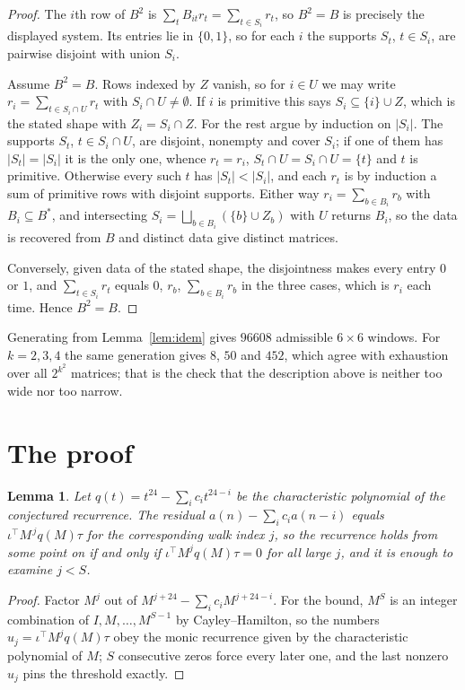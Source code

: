 \documentclass[11pt,a4paper]{article}
\theoremstyle{plain}
\newtheorem{lemma}[theorem]{Lemma}
\theoremstyle{definition}
\begin{document}
\begin{proof}
The $i$th row of $B^2$ is $\sum_t B_{it}r_t=\sum_{t\in S_i}r_t$, so $B^2=B$ is precisely the
displayed system. Its entries lie in $\{0,1\}$, so for each $i$ the supports $S_t$,
$t\in S_i$, are pairwise disjoint with union $S_i$.

Assume $B^2=B$. Rows indexed by $Z$ vanish, so for $i\in U$ we may write
$r_i=\sum_{t\in S_i\cap U}r_t$ with $S_i\cap U\neq\emptyset$. If $i$ is primitive this says
$S_i\subseteq\{i\}\cup Z$, which is the stated shape with $Z_i=S_i\cap Z$. For the rest argue
by induction on $|S_i|$. The supports $S_t$, $t\in S_i\cap U$, are disjoint, nonempty and
cover $S_i$; if one of them has $|S_t|=|S_i|$ it is the only one, whence $r_t=r_i$,
$S_t\cap U=S_i\cap U=\{t\}$ and $t$ is primitive. Otherwise every such $t$ has
$|S_t|<|S_i|$, and each $r_t$ is by induction a sum of primitive rows with disjoint supports.
Either way $r_i=\sum_{b\in B_i}r_b$ with $B_i\subseteq B^{\ast}$, and intersecting
$S_i=\bigsqcup_{b\in B_i}(\{b\}\cup Z_b)$ with $U$ returns $B_i$, so the data is recovered
from $B$ and distinct data give distinct matrices.

Conversely, given data of the stated shape, the disjointness makes every entry $0$ or $1$, and
$\sum_{t\in S_i}r_t$ equals $0$, $r_b$, $\sum_{b\in B_i}r_b$ in the three cases, which is
$r_i$ each time. Hence $B^2=B$.
\end{proof}

Generating from Lemma~\ref{lem:idem} gives $96608$ admissible $6\times6$ windows. For
$k=2,3,4$ the same generation gives $8$, $50$ and $452$, which agree with exhaustion over all
$2^{k^2}$ matrices; that is the check that the description above is neither too wide nor too
narrow.

\section{The proof}

\begin{lemma}\label{lem:crit}
Let $q(t)=t^{24}-\sum_i c_it^{24-i}$ be the characteristic polynomial of the
conjectured recurrence. The residual $a(n)-\sum_ic_ia(n-i)$ equals
$\iota^{\!\top}M^{\,j}q(M)\tau$ for the corresponding walk index $j$, so the recurrence
holds from some point on if and only if $\iota^{\!\top}M^{j}q(M)\tau=0$ for all large $j$,
and it is enough to examine $j<S$.
\end{lemma}

\begin{proof}
Factor $M^{j}$ out of $M^{j+24}-\sum_ic_iM^{j+24-i}$. For the bound, $M^{S}$
is an integer combination of $I,M,\dots,M^{S-1}$ by Cayley--Hamilton, so the numbers
$u_j=\iota^{\!\top}M^{j}q(M)\tau$ obey the monic recurrence given by the characteristic
polynomial of $M$; $S$ consecutive zeros force every later one, and the last nonzero $u_j$
pins the threshold exactly.
\end{proof}
\end{document}
